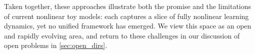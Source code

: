 Taken together, these approaches illustrate both the promise and the limitations of current nonlinear toy models: each captures a slice of fully nonlinear learning dynamics, yet no unified framework has emerged.
We view this space as an open and rapidly evolving area, and return to these challenges in our discussion of open problems in \cref{sec:open_dirs}.
